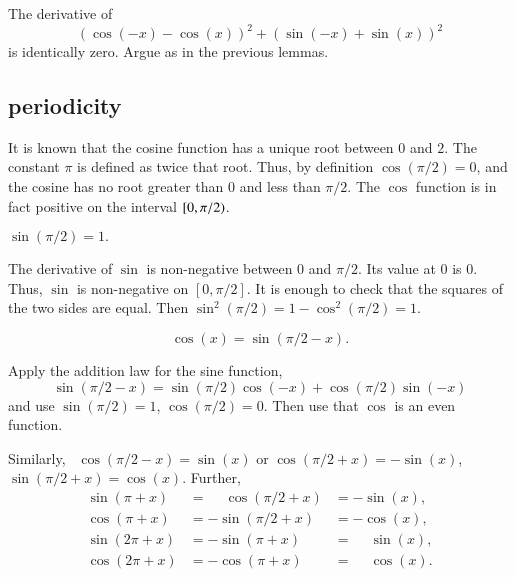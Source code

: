 \begin{proved}
The derivative of
    $$(\cos(-x) - \cos(x))^2 + (\sin(-x) +\sin(x))^2$$
is identically zero.  Argue as in the previous lemmas.
\swallowed\end{proved}

\subsection{periodicity}
\label{sec:pi}

It is known that the cosine function has a unique root between $0$
and $2$. The constant $\pi$ is defined as twice that root.  Thus, by
definition $\cos(\pi/2) = 0$, and the cosine has no root greater
than $0$ and less than $\pi/2$. The $\cos$ function is in fact
positive on the interval $[ 0,\pi/2)$.

\begin{lemma}\label{lemma:sin-pi2}
    $\sin (\pi/2) = 1.$
\end{lemma}

\begin{proved}
The derivative of $\sin$ is non-negative between $0$ and $\pi/2$.
Its value at $0$ is $0$.  Thus, $\sin$ is non-negative on
$[0,\pi/2]$.  It is enough to check
that the squares of the two sides are equal. Then $\sin^2(\pi/2) =
{1-\cos^2(\pi/2)} = 1$.
\swallowed\end{proved}

\begin{lemma}\label{lemma:cos-sin}
    $$\cos(x) = \sin(\pi/2 - x).$$
\end{lemma}

\begin{proved}
    Apply the addition law for the sine function,
    $$\sin(\pi/2 - x) = \sin(\pi/2)\cos(-x) + \cos(\pi/2)\sin(-x)$$
    and use
    $\sin(\pi/2) = 1$, $\cos(\pi/2) = 0$.  Then use that $\cos$ is
    an even function.
\swallowed\end{proved}

Similarly,~%
%
$\cos(\pi/2 - x) = \sin(x)$ or $\cos(\pi/2 + x) =
-\sin(x)$, $\sin(\pi/2 + x) = \cos(x)$.  Further,
    $$\begin{array}{lll}
      \sin(\pi + x) &= \phantom{-}\cos(\pi/2 + x) &= -\sin(x),\\
      \cos(\pi + x) &= -\sin(\pi/2 + x) &= -\cos(x),\\
      \sin(2\pi + x) &= -\sin(\pi + x) &= \phantom{-}\sin(x),\\
      \cos(2\pi + x) &= -\cos(\pi + x) &= \phantom{-}\cos(x).
      \end{array}$$


